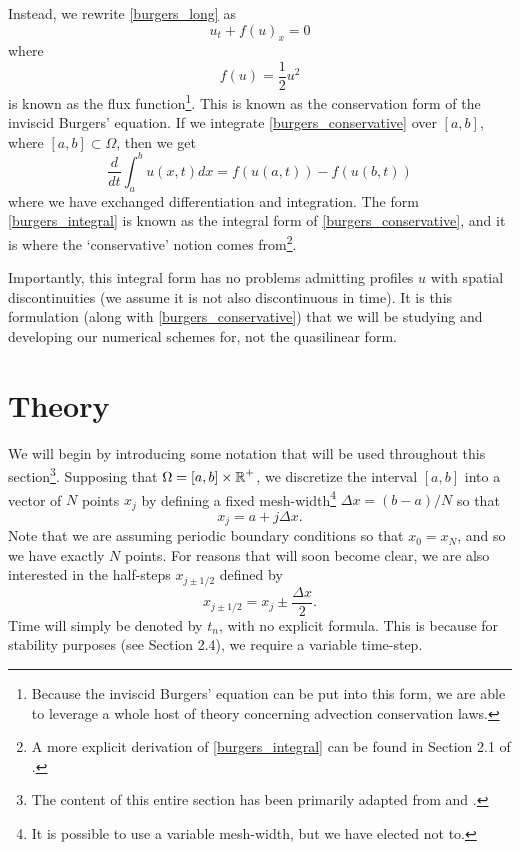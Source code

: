 \documentclass{myproject}
\begin{document}
Instead, we rewrite \eqref{burgers_long} as
\begin{equation}\label{burgers_conservative}
    u_t + f(u)_x = 0
\end{equation}
where
\begin{equation}
    f(u) = \frac{1}{2}u^2
\end{equation}
is known as the flux function\footnote{Because the inviscid Burgers' equation can be put into this form, we are able to leverage a whole host of theory concerning advection conservation laws.}. This is known as the conservation form of the inviscid Burgers' equation. If we integrate \eqref{burgers_conservative} over $[a,b]$, where $[a,b] \subset \Omega$, then we get
\begin{equation}\label{burgers_integral}
    \frac{d}{dt}\int_{a}^{b} u(x,t) dx = f(u(a,t)) - f(u(b,t))
\end{equation}
where we have exchanged differentiation and integration. The form \eqref{burgers_integral} is known as the integral form of \eqref{burgers_conservative}, and it is where the `conservative' notion comes from\footnote{A more explicit derivation of \eqref{burgers_integral} can be found in Section 2.1 of \cite{leveque2002}.}.

Importantly, this integral form has no problems admitting profiles $u$ with spatial discontinuities (we assume it is not also discontinuous in time). It is this formulation (along with \eqref{burgers_conservative}) that we will be studying and developing our numerical schemes for, not the quasilinear form. 

\section{Theory}

We will begin by introducing some notation that will be used throughout this section\footnote{The content of this entire section has been primarily adapted from \cite{leveque1992} and \cite{leveque2002}.}. Supposing that $\Omega = [a,b]\times\operatorname{\mathbb{R}}^+$, we discretize the interval $[a,b]$ into a vector of $N$ points $x_j$ by defining a fixed mesh-width\footnote{It is possible to use a variable mesh-width, but we have elected not to.} $\Delta x = (b-a)/N$ so that
\begin{equation}
    x_j = a + j\Delta x.
\end{equation}
Note that we are assuming periodic boundary conditions so that $x_0 = x_{N}$, and so we have exactly $N$ points. For reasons that will soon become clear, we are also interested in the half-steps $x_{j\pm1/2}$ defined by
\begin{equation}
    x_{j\pm1/2} = x_j \pm \frac{\Delta x}{2}.
\end{equation}
Time will simply be denoted by $t_n$, with no explicit formula. This is because for stability purposes (see Section 2.4), we require a variable time-step.
\end{document}
